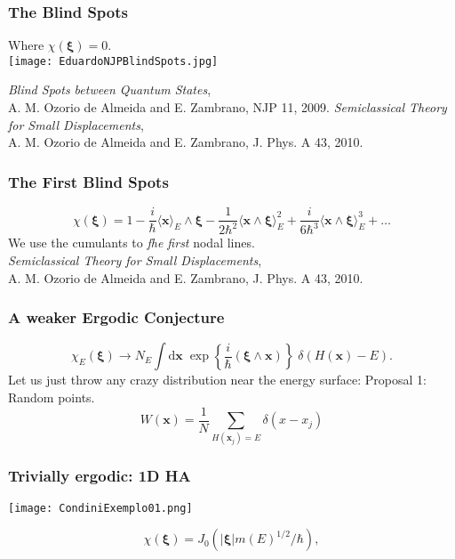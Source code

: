 \documentclass{beamer}
\newcommand{\ihb}{\frac{i}{\hbar}}
\newcommand{\xfase}{\mathbf{x}}
\newcommand{\xifase}{ {\boldsymbol{\xi}} }
\newcommand{\Prom}[2]{\langle #1\rangle_#2}
\newcommand{\rd}{\!\mathrm{d}}
\begin{document}
\begin{frame}
  \frametitle{The Blind Spots}
  \begin{center}
    Where $\chi(\xifase)=0$. \\
    \texttt{[image: EduardoNJPBlindSpots.jpg]} 
  \end{center}
  \emph{Blind Spots between Quantum States},\\
  A. M. Ozorio de Almeida and E. Zambrano, NJP 11, 2009.
  \emph{Semiclassical Theory for Small Displacements},\\
  A. M. Ozorio de Almeida and E. Zambrano, J. Phys. A 43, 2010.    
\end{frame}    


\begin{frame}
  \frametitle{The First Blind Spots} 
  \begin{equation} \label{expansionpot}
    \chi(\xifase)=1-\ihb \Prom{\xfase}{E}\wedge\xifase
    -\frac{1}{2 \hbar^2}\Prom{\xfase\wedge\xifase}{E}^2
    +\frac{i}{6 \hbar^3 }\Prom{\xfase\wedge\xifase}{E}^3+\ldots
  \end{equation} 
  We use the cumulants to \emph{fhe first} nodal lines.\\
\emph{Semiclassical Theory for Small Displacements},\\
A. M. Ozorio de Almeida and E. Zambrano, J. Phys. A 43, 2010.    
\end{frame}    


\begin{frame}
  \frametitle{A weaker Ergodic Conjecture}
  \begin{equation}
    \chi_E(\xifase) \rightarrow N_E \int \rd\xfase \; \exp\left\{\frac{i}{\hbar}(\xifase\wedge \xfase)\right\} \; \delta(H(\xfase)-E).
  \end{equation}
  \label{weakhyp}
Let us just throw any crazy distribution near the energy surface:
Proposal 1: Random points. 
  \begin{equation}
    W(\xfase) = \frac{1}{N}\sum_{H(\xfase_j)=E} \delta(x-x_j)
  \end{equation}
\end{frame}    



\begin{frame}
  \frametitle{Trivially ergodic: 1D HA}
  \begin{center}
  \texttt{[image: CondiniExemplo01.png]}
  \end{center}
  \begin{equation}\label{BerryApproach}
    \chi(\xifase)=J_0(|\xifase|m(E)^{1/2}/\hbar),
  \end{equation}
\end{frame}
\end{document}
